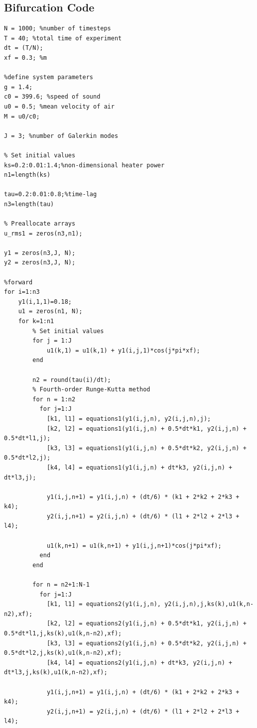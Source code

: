\documentclass[8pt]{article} %
\begin{document}
\subsection{Bifurcation Code}\label{code2}
\begin{lstlisting}
N = 1000; %number of timesteps
T = 40; %total time of experiment
dt = (T/N);
xf = 0.3; %m

%define system parameters
g = 1.4;
c0 = 399.6; %speed of sound
u0 = 0.5; %mean velocity of air
M = u0/c0;

J = 3; %number of Galerkin modes

% Set initial values
ks=0.2:0.01:1.4;%non-dimensional heater power
n1=length(ks)

tau=0.2:0.01:0.8;%time-lag
n3=length(tau)

% Preallocate arrays
u_rms1 = zeros(n3,n1);

y1 = zeros(n3,J, N);
y2 = zeros(n3,J, N);

%forward
for i=1:n3
    y1(i,1,1)=0.18;
    u1 = zeros(n1, N);
    for k=1:n1
        % Set initial values
        for j = 1:J
            u1(k,1) = u1(k,1) + y1(i,j,1)*cos(j*pi*xf);
        end
            
        n2 = round(tau(i)/dt);
        % Fourth-order Runge-Kutta method
        for n = 1:n2   
          for j=1:J
            [k1, l1] = equations1(y1(i,j,n), y2(i,j,n),j);
            [k2, l2] = equations1(y1(i,j,n) + 0.5*dt*k1, y2(i,j,n) + 0.5*dt*l1,j);
            [k3, l3] = equations1(y1(i,j,n) + 0.5*dt*k2, y2(i,j,n) + 0.5*dt*l2,j);
            [k4, l4] = equations1(y1(i,j,n) + dt*k3, y2(i,j,n) + dt*l3,j);
        
            y1(i,j,n+1) = y1(i,j,n) + (dt/6) * (k1 + 2*k2 + 2*k3 + k4);
            y2(i,j,n+1) = y2(i,j,n) + (dt/6) * (l1 + 2*l2 + 2*l3 + l4);
    
            u1(k,n+1) = u1(k,n+1) + y1(i,j,n+1)*cos(j*pi*xf);
          end
        end
    
        for n = n2+1:N-1
          for j=1:J
            [k1, l1] = equations2(y1(i,j,n), y2(i,j,n),j,ks(k),u1(k,n-n2),xf);
            [k2, l2] = equations2(y1(i,j,n) + 0.5*dt*k1, y2(i,j,n) + 0.5*dt*l1,j,ks(k),u1(k,n-n2),xf);
            [k3, l3] = equations2(y1(i,j,n) + 0.5*dt*k2, y2(i,j,n) + 0.5*dt*l2,j,ks(k),u1(k,n-n2),xf);
            [k4, l4] = equations2(y1(i,j,n) + dt*k3, y2(i,j,n) + dt*l3,j,ks(k),u1(k,n-n2),xf);
        
            y1(i,j,n+1) = y1(i,j,n) + (dt/6) * (k1 + 2*k2 + 2*k3 + k4);
            y2(i,j,n+1) = y2(i,j,n) + (dt/6) * (l1 + 2*l2 + 2*l3 + l4);
    

\end{lstlisting}
\end{document}
